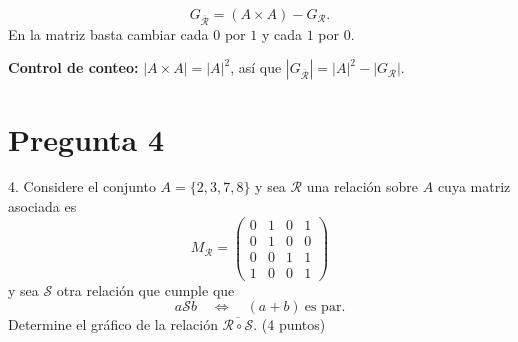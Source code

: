 \documentclass[11pt]{article}
\begin{document}
\begin{minipage}[t]{0.56\textwidth}
\[
G_{\overline{\mathcal R}}=(A\times A)-G_{\mathcal R}.
\]
En la matriz basta cambiar cada $0$ por $1$ y cada $1$ por $0$.

\textbf{Control de conteo:} $|A\times A|=|A|^2$, así que $|G_{\overline{\mathcal R}}|=|A|^2-|G_{\mathcal R}|$.
\end{minipage}\hfill
\begin{minipage}[t]{0.40\textwidth}
\vspace{0.2em}
\begin{center}
\end{center}
\end{minipage}

\clearpage
\section*{Pregunta 4}

4. Considere el conjunto $A=\{2,3,7,8\}$ y sea $\mathcal R$ una relación sobre $A$ cuya matriz asociada es
\[
M_{\mathcal R}=\begin{pmatrix}0&1&0&1\\0&1&0&0\\0&0&1&1\\1&0&0&1\end{pmatrix}
\]
y sea $\mathcal S$ otra relación que cumple que
\[
a\mathcal Sb\quad\Leftrightarrow\quad (a+b)\ \text{es par.}
\]
Determine el \colorbox{green!35}{gráfico de la relación $\overline{\mathcal R\circ\mathcal S}$.} \hfill (4 puntos)
\end{document}
